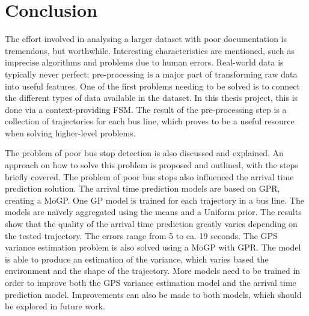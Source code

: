 \chapter{Conclusion}
\label{cha:conclusion}

The effort involved in analysing a larger dataset with poor documentation is tremendous, but worthwhile.
Interesting characteristics are mentioned, such as imprecise algorithms and problems due to human errors.
Real-world data is typically never perfect; pre-processing is a major part of transforming raw data into useful features.
One of the first problems needing to be solved is to connect the different types of data available in the dataset.
In this thesis project, this is done via a context-providing FSM.
The result of the pre-processing step is a collection of trajectories for each bus line, which proves to be a useful resource when solving higher-level problems.

The problem of poor bus stop detection is also discussed and explained.
An approach on how to solve this problem is proposed and outlined, with the steps briefly covered.
The problem of poor bus stops also influenced the arrival time prediction solution.
The arrival time prediction models are based on GPR, creating a MoGP.
One GP model is trained for each trajectory in a bus line.
The models are naïvely aggregated using the means and a Uniform prior.
The results show that the quality of the arrival time prediction greatly varies depending on the tested trajectory.
The errors range from 5 to ca. 19 seconds.
The GPS variance estimation problem is also solved using a MoGP with GPR. 
The model is able to produce an estimation of the variance, which varies based the environment and the shape of the trajectory.
More models need to be trained in order to improve both the GPS variance estimation model and the arrival time prediction model.
Improvements can also be made to both models, which should be explored in future work. 